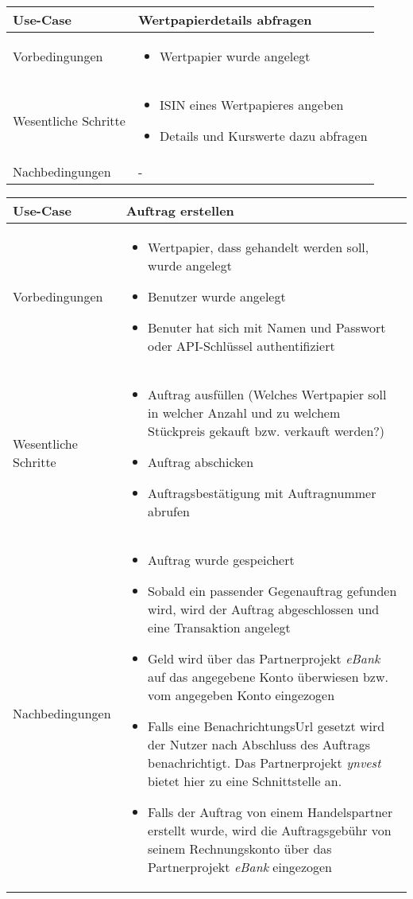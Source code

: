 \documentclass[12pt, a4paper, titlepage]{article}
\newcommand{\andiProj}[0]{\textit{ynvest}}
\newcommand{\sinaProj}[0]{\textit{eBank}}
\begin{document}
\begin{tabular}{|p{}|p{}|}
	\hline
	Use-Case & Wertpapierdetails abfragen \\
	\hline
	Vorbedingungen &
		\begin{itemize}
			\item Wertpapier wurde angelegt
		\end{itemize} \\
	\hline
	Wesentliche Schritte &
		\begin{itemize}
			\item ISIN eines Wertpapieres angeben
			\item Details und Kurswerte dazu abfragen
		\end{itemize} \\
	\hline
	Nachbedingungen & - \\
	\hline
\end{tabular}\par

\begin{tabular}{|p{}|p{}|}
	\hline
	Use-Case & Auftrag erstellen \\
	\hline
	Vorbedingungen &
		\begin{itemize}
			\item Wertpapier, dass gehandelt werden soll, wurde angelegt
			\item Benutzer wurde angelegt
			\item Benuter hat sich mit Namen und Passwort oder API-Schlüssel
			authentifiziert
		\end{itemize} \\
	\hline
	Wesentliche Schritte &
		\begin{itemize}
			\item Auftrag ausfüllen (Welches Wertpapier soll in welcher Anzahl und zu
			welchem Stückpreis gekauft bzw. verkauft werden?)
			\item Auftrag abschicken
			\item Auftragsbestätigung mit Auftragnummer abrufen
		\end{itemize} \\
	\hline
	Nachbedingungen &
		\begin{itemize}
			\item Auftrag wurde gespeichert
			\item Sobald ein passender Gegenauftrag gefunden wird,
			wird der Auftrag abgeschlossen und eine Transaktion angelegt
			\item Geld wird über das Partnerprojekt \sinaProj{} auf das angegebene
			Konto überwiesen bzw. vom angegeben Konto eingezogen
			\item Falls eine BenachrichtungsUrl gesetzt wird der Nutzer nach
			Abschluss des Auftrags benachrichtigt.
			Das Partnerprojekt \andiProj{} bietet hier zu eine Schnittstelle an.
			\item Falls der Auftrag von einem Handelspartner erstellt wurde,
			wird die Auftragsgebühr von seinem Rechnungskonto über das
			Partnerprojekt \sinaProj{} eingezogen
		\end{itemize} \\
	\hline
\end{tabular}\par
\end{document}
